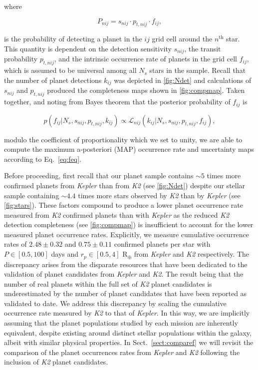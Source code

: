 \documentclass[twocolumn]{emulateapj}
\newcommand{\kepler}[1]{\emph{Kepler}#1}
\newcommand{\ktwo}[1]{\emph{K2}#1}
\begin{document}
\noindent where

\begin{equation}
  P_{nij} = s_{nij} \cdot p_{t,nij} \cdot f_{ij},
  \label{eq:prob}
\end{equation}

\noindent is the probability of detecting a planet in the $ij$ grid cell around the $n^{\text{th}}$ star.
This quantity is dependent on the detection sensitivity $s_{nij}$, the transit probability $p_{t,nij}$, and the 
intrinsic occurrence rate of planets in the grid cell $f_{ij}$, which is assumed to be universal among all
$N_s$ stars in the sample.
Recall that the number of planet detections $k_{ij}$ was depicted in \autoref{fig:Ndet} and
calculations of $s_{nij}$ and $p_{t,nij}$ produced the completeness maps shown in \autoref{fig:compmap}. 
Taken together, and noting from Bayes theorem that the posterior probability of $f_{ij}$ is 

\begin{equation}
  p(f_{ij}|N_s,s_{nij},p_{t,nij},k_{ij}) \propto \mathcal{L}_{nij}(k_{ij}|N_s,s_{nij},p_{t,nij},f_{ij}),
  \label{eq:feq}
\end{equation}
  
\noindent modulo the coefficient of proportionality which we set to unity, we are able to compute
the maximum a-posteriori (MAP) occurrence rate and uncertainty maps according to Eq.~\ref{eq:feq}.

Before proceeding, first recall that our planet sample contains $\sim 5$ times more confirmed planets
from \kepler{} than from \ktwo{}
(see \autoref{fig:Ndet}) despite our stellar sample containing $\sim 4.4$ times more stars observed by
\ktwo{} than by \kepler{} 
(see \autoref{fig:stars}). These factors compound to produce a lower planet occurrence rate measured
from \ktwo{} confirmed planets than with \kepler{} as the reduced \ktwo{} detection completeness
(see \autoref{fig:compmap}) is insufficient to account for the lower measured
planet occurrence rates. Explicitly, we measure cumulative occurrence rates of
$2.48\pm 0.32$ and $0.75\pm 0.11$ confirmed planets per star with $P\in [0.5,100]$ days
and $r_p\in [0.5,4]$ R$_{\oplus}$ from \kepler{} and \ktwo{} respectively.
The discrepancy arises from the disparate resources that have
been dedicated to the validation of planet candidates from \kepler{} and \ktwo{.} The result being that
the number of real planets within the full set of \ktwo{} planet candidates is underestimated
by the number of planet candidates that have been reported as validated to date. We address this discrepancy
by scaling the cumulative occurrence rate measured by \ktwo{} to that of \kepler{.}
In this way, we are implicitly assuming that the planet populations studied by each mission are inherently
equivalent, despite existing around distinct stellar populations within the galaxy, albeit with similar
physical properties. In Sect.~\ref{sect:comparef} we will revisit the comparison of the planet occurrences
rates from \kepler{} and \ktwo{} following the inclusion of \ktwo{} planet candidates.
\end{document}
